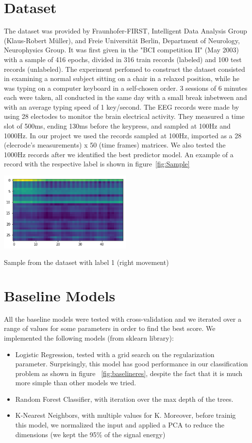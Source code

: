 \documentclass[10pt,conference,compsocconf]{IEEEtran}
\begin{document}
\section{Dataset}
\label{sec:data-analysis}
The dataset was provided by Fraunhofer-FIRST, Intelligent Data Analysis Group (Klaus-Robert Müller), and Freie Universität Berlin, Department of Neurology, Neurophysics Group. It was first given in the "BCI competition II" (May 2003) with a sample of 416 epochs, divided in 316 train records (labeled) and 100 test records (unlabeled).
The experiment perfomed to construct the dataset consisted in examining a normal subject sitting on a chair in a relaxed position, while he was typing on a computer keyboard in a self-chosen order. 3 sessions of 6 minutes each were taken, all conducted in the same day with a small break inbetween and with an average typing speed of 1 key/second. The EEG records were made by using 28 electodes to monitor the brain electrical activity. They measured a time slot of 500ms, ending 130ms before the keypress, and sampled at 100Hz and 1000Hz. 
In our project we used the records sampled at 100Hz, imported as a 28 (elecrode's measurements) x 50 (time frames) matrices. We also tested the 1000Hz records after we identified the best predictor model.
An example of a record with the respective label is shown in figure~\ref{fig:Sample}

\begin{center}
	\captionsetup{type=figure}
	\includegraphics[width=0.5\textwidth]{img/sample.png}
	\label{fig:Sample}
	\caption {Sample from the dataset with label 1 (right movement)}
\end{center}


\section{Baseline Models}
\label{sec:baseline}
All the baseline models were tested with cross-validation and we iterated over a range of values for some parameters in order to find the best score.
We implemented the following models (from sklearn library):
\begin{itemize}
\item Logistic Regression, tested with a grid search on the regularization parameter. Surprisingly, this model has good performance in our classification problem as shown in figure ~\ref{fig:baselineres}, despite the fact that it is much more simple than other models we tried.
\item Random Forest Classifier, with iteration over the max depth of the trees.
\item K-Nearest Neighbors, with multiple values for K. Moreover, before trainig this model, we normalized the input and applied a PCA to reduce the dimensions (we kept the 95\% of the signal energy)
\end{itemize}
\end{document}
